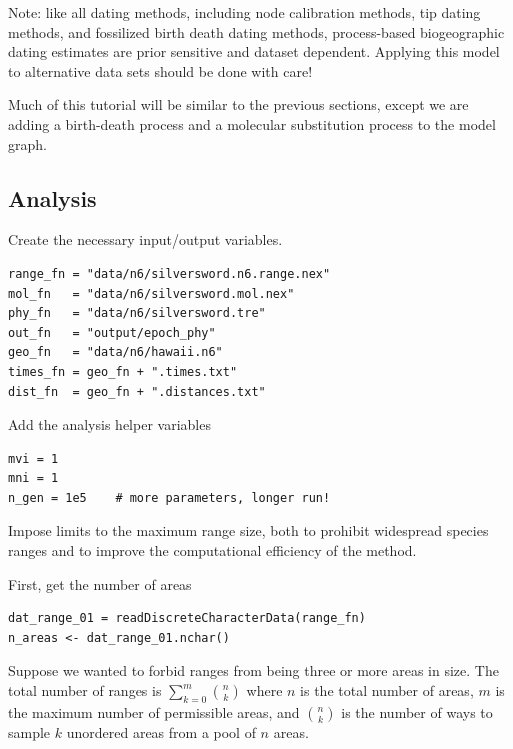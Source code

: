 Note: like all dating methods, including node calibration methods, tip dating methods, and fossilized birth death dating methods, process-based biogeographic dating estimates are prior sensitive and dataset dependent.
Applying this model to alternative data sets should be done with care!

Much of this tutorial will be similar to the previous sections, except we are adding a birth-death process and a molecular substitution process to the model graph.

\subsection*{Analysis}

Create the necessary input/output variables.

\begin{snugshade}
\begin{lstlisting}
range_fn = "data/n6/silversword.n6.range.nex"
mol_fn   = "data/n6/silversword.mol.nex"
phy_fn   = "data/n6/silversword.tre"
out_fn   = "output/epoch_phy"
geo_fn   = "data/n6/hawaii.n6"
times_fn = geo_fn + ".times.txt"
dist_fn  = geo_fn + ".distances.txt"
\end{lstlisting}
\end{snugshade}

Add the analysis helper variables

\begin{snugshade}
\begin{lstlisting}
mvi = 1
mni = 1
n_gen = 1e5    # more parameters, longer run!
\end{lstlisting}
\end{snugshade}

Impose limits to the maximum range size, both to prohibit widespread species ranges and to improve the computational efficiency of the method.

First, get the number of areas
\begin{snugshade}
\begin{lstlisting}
dat_range_01 = readDiscreteCharacterData(range_fn)
n_areas <- dat_range_01.nchar()
\end{lstlisting}
\end{snugshade}

Suppose we wanted to forbid ranges from being three or more areas in size.
The total number of ranges is $\sum_{k=0}^m {{n}\choose{k}}$ where $n$ is the total number of areas, $m$ is the maximum number of permissible areas, and ${{n}\choose{k}}$ is the number of ways to sample $k$ unordered areas from a pool of $n$ areas.

